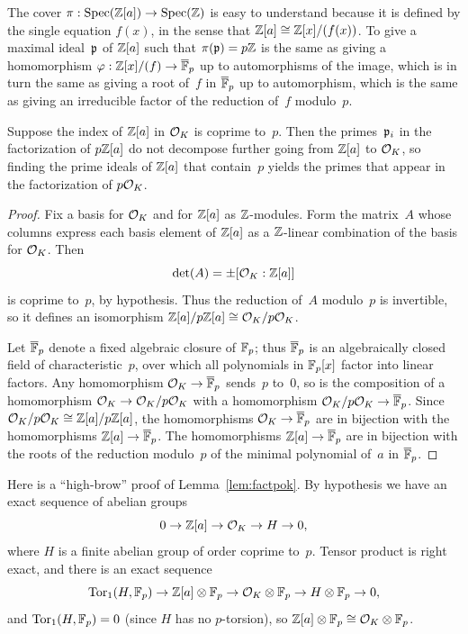 The cover $\pi:\operatorname{Spec}(\mathbb{Z}[a])\rightarrow \operatorname{Spec}(\mathbb{Z})$ is easy to understand
because it is defined by the single equation $f(x)$, in the sense
that $\mathbb{Z}[a]\cong \mathbb{Z}[x]/(f(x))$.  To give a
maximal ideal~$\mathfrak{p}$ of $\mathbb{Z}[a]$ such that $\pi(\mathfrak{p}) = p\mathbb{Z}$ is the
same as giving a homomorphism $\varphi:\mathbb{Z}[x]/(f) \rightarrow \overline{\mathbb{F}}_p$ up to
automorphisms of the image, which is in turn the same as giving a
root of~$f$ in $\overline{\mathbb{F}}_p$ up to automorphism, which is the same
as giving an irreducible factor of the reduction of~$f$ modulo~$p$.

\begin{lemma}\label{lem:factpok}
Suppose the index of $\mathbb{Z}[a]$ in $\mathcal{O}_K$ is coprime to~$p$.  Then
the primes~$\mathfrak{p}_i$ in the factorization of $p\mathbb{Z}[a]$ do not
decompose further going from $\mathbb{Z}[a]$ to $\mathcal{O}_K$, so finding the
prime ideals of $\mathbb{Z}[a]$ that contain~$p$ yields the primes
that appear in the factorization of $p\mathcal{O}_K$.
\end{lemma}
\begin{proof}
Fix a basis for $\mathcal{O}_K$ and for $\mathbb{Z}[a]$ as $\mathbb{Z}$-modules.
Form the matrix~$A$ whose columns express each basis element
of $\mathbb{Z}[a]$ as a $\mathbb{Z}$-linear combination of the basis for $\mathcal{O}_K$.
Then
$$
\det(A) = \pm [\mathcal{O}_K:\mathbb{Z}[a]]
$$
is coprime to~$p$, by hypothesis.  Thus the reduction of~$A$
modulo~$p$ is invertible, so it defines an isomorphism
$\mathbb{Z}[a]/p\mathbb{Z}[a] \cong \mathcal{O}_K/p\mathcal{O}_K$.

Let $\overline{\mathbb{F}}_p$ denote a fixed algebraic closure of $\mathbb{F}_p$; thus $\overline{\mathbb{F}}_p$
is an algebraically closed field of characteristic~$p$, over which
all polynomials in $\mathbb{F}_p[x]$ factor into linear factors.
Any homomorphism $\mathcal{O}_K\to \overline{\mathbb{F}}_p$ sends~$p$ to~$0$, so is the composition of a homomorphism $\mathcal{O}_K \to \mathcal{O}_K/p\mathcal{O}_K$ with a homomorphism
$\mathcal{O}_K/p\mathcal{O}_K \to \overline{\mathbb{F}}_p$.  Since $\mathcal{O}_K/p\mathcal{O}_K \cong
\mathbb{Z}[a]/p\mathbb{Z}[a]$, the homomorphisms $\mathcal{O}_K\to \overline{\mathbb{F}}_p$ are in bijection
with the homomorphisms $\mathbb{Z}[a]\to \overline{\mathbb{F}}_p$.  The homomorphisms
$\mathbb{Z}[a]\to\overline{\mathbb{F}}_p$ are in bijection with the roots of the reduction
modulo~$p$ of the minimal polynomial of~$a$ in $\overline{\mathbb{F}}_p$.
\end{proof}

\begin{remark}
Here is a ``high-brow'' proof of Lemma~\ref{lem:factpok}.
By hypothesis we have an exact sequence
of abelian groups
$$ 0 \to \mathbb{Z}[a]\to \mathcal{O}_K \to H \to 0,$$
where $H$ is a finite abelian group of order coprime
to~$p$.  Tensor product is right exact, and there is
an exact sequence
$$
   \operatorname{Tor}_1(H,\mathbb{F}_p) \to \mathbb{Z}[a]\otimes\mathbb{F}_p \to \mathcal{O}_K\otimes\mathbb{F}_p \to H\otimes\mathbb{F}_p \to 0,
$$
and $\operatorname{Tor}_1(H,\mathbb{F}_p) = 0$ (since $H$ has no $p$-torsion),
so $\mathbb{Z}[a]\otimes\mathbb{F}_p\cong \mathcal{O}_K\otimes\mathbb{F}_p$.
\end{remark}

